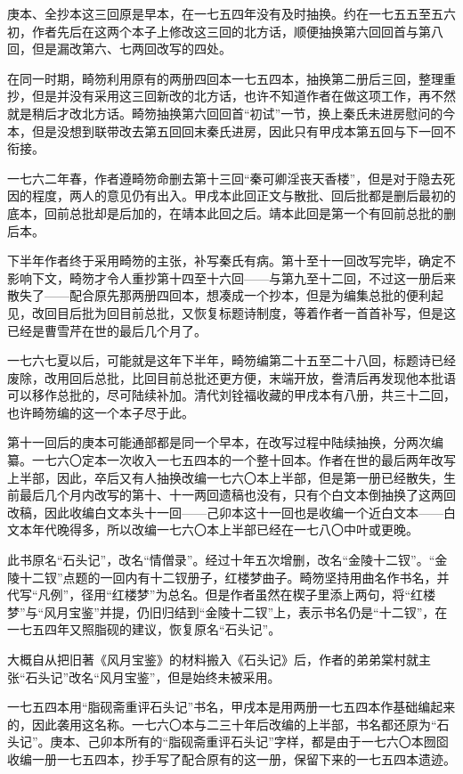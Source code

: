 \par 庚本、全抄本这三回原是早本，在一七五四年没有及时抽换。约在一七五五至五六初，作者先后在这两个本子上修改这三回的北方话，顺便抽换第六回回首与第八回，但是漏改第六、七两回改写的四处。
\par 在同一时期，畸笏利用原有的两册四回本一七五四本，抽换第二册后三回，整理重抄，但是并没有采用这三回新改的北方话，也许不知道作者在做这项工作，再不然就是稍后才改北方话。畸笏抽换第六回回首“初试”一节，换上秦氏未进房慰问的今本，但是没想到联带改去第五回回末秦氏进房，因此只有甲戌本第五回与下一回不衔接。
\par 一七六二年春，作者遵畸笏命删去第十三回“秦可卿淫丧天香楼”，但是对于隐去死因的程度，两人的意见仍有出入。甲戌本此回正文与散批、回后批都是删后最初的底本，回前总批却是后加的，在靖本此回之后。靖本此回是第一个有回前总批的删后本。
\par 下半年作者终于采用畸笏的主张，补写秦氏有病。第十至十一回改写完毕，确定不影响下文，畸笏才令人重抄第十四至十六回——与第九至十二回，不过这一册后来散失了——配合原先那两册四回本，想凑成一个抄本，但是为编集总批的便利起见，改回目后批为回目前总批，又恢复标题诗制度，等着作者一首首补写，但是这已经是曹雪芹在世的最后几个月了。
\par 一七六七夏以后，可能就是这年下半年，畸笏编第二十五至二十八回，标题诗已经废除，改用回后总批，比回目前总批还更方便，末端开放，誊清后再发现他本批语可以移作总批的，尽可陆续补加。清代刘铨福收藏的甲戌本有八册，共三十二回，也许畸笏编的这一个本子尽于此。
\par 第十一回后的庚本可能通部都是同一个早本，在改写过程中陆续抽换，分两次编纂。一七六〇定本一次收入一七五四本的一个整十回本。作者在世的最后两年改写上半部，因此，卒后又有人抽换改编一七六〇本上半部，但是第一册已经散失，生前最后几个月内改写的第十、十一两回遗稿也没有，只有个白文本倒抽换了这两回改稿，因此收编白文本头十一回——己卯本这十一回也是收编一个近白文本——白文本年代晚得多，所以改编一七六〇本上半部已经在一七八〇中叶或更晚。
\par 此书原名“石头记”，改名“情僧录”。经过十年五次增删，改名“金陵十二钗”。“金陵十二钗”点题的一回内有十二钗册子，红楼梦曲子。畸笏坚持用曲名作书名，并代写“凡例”，径用“红楼梦”为总名。但是作者虽然在楔子里添上两句，将“红楼梦”与“风月宝鉴”并提，仍旧归结到“金陵十二钗”上，表示书名仍是“十二钗”，在一七五四年又照脂砚的建议，恢复原名“石头记”。
\par 大概自从把旧著《风月宝鉴》的材料搬入《石头记》后，作者的弟弟棠村就主张“石头记”改名“风月宝鉴”，但是始终未被采用。
\par 一七五四本用“脂砚斋重评石头记”书名，甲戌本是用两册一七五四本作基础编起来的，因此袭用这名称。一七六〇本与二三十年后改编的上半部，书名都还原为“石头记”。庚本、己卯本所有的“脂砚斋重评石头记”字样，都是由于一七六〇本囫囵收编一册一七五四本，抄手写了配合原有的这一册，保留下来的一七五四本遗迹。
 



